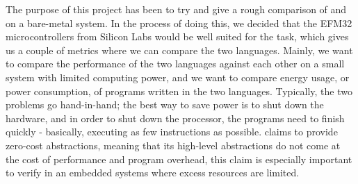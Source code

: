 The purpose of this project has been to try and give a rough comparison of {\rust} and {\C} on a bare-metal system.
In the process of doing this, we decided that the EFM32 microcontrollers from Silicon Labs would be well suited for the task, which gives us a couple of metrics where we can compare the two languages.
Mainly, we want to compare the performance of the two languages against each other on a small system with limited computing power, and we want to compare energy usage, or power consumption, of programs written in the two languages.
Typically, the two problems go hand-in-hand; the best way to save power is to shut down the hardware, and in order to shut down the processor, the programs need to finish quickly - basically, executing as few instructions as possible.
{\rust} claims to provide zero-cost abstractions, meaning that its high-level abstractions do not come at the cost of performance and program overhead, this claim is especially important to verify in an embedded systems where excess resources are limited.



